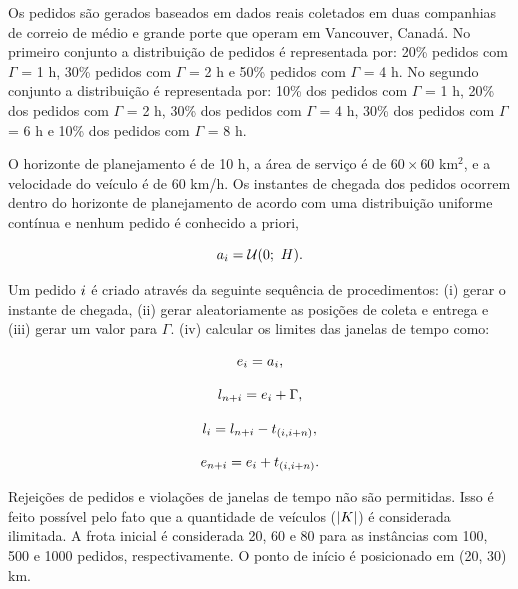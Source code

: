 Os pedidos são gerados baseados em dados reais coletados em duas companhias de 
correio de médio e grande porte que operam em Vancouver, Canadá.
No primeiro conjunto a distribuição de pedidos é representada por: 
20\% pedidos com $\Gamma$ = 1 h, 30\% pedidos com $\Gamma$ = 2 h e 
50\% pedidos com $\Gamma$ = 4 h.
No segundo conjunto a distribuição é representada por: 10\% dos pedidos com 
$\Gamma$ = 1 h, 20\% dos pedidos com $\Gamma$ = 2 h, 30\% dos pedidos com 
$\Gamma$ = 4 h, 30\% dos pedidos com $\Gamma$ = 6 h 
e 10\% dos pedidos com $\Gamma$ = 8 h.

O horizonte de planejamento é de 10 h, a área de serviço é de $60 \times 60$ 
km$^2$, e a velocidade do veículo é de 60 km/h. 
Os instantes de chegada dos pedidos ocorrem dentro do horizonte de planejamento
de acordo com uma distribuição uniforme contínua e nenhum pedido é conhecido 
a priori,

\begin{equation}
  a_i = \mathcal{U}(0;\ H).
\end{equation}


Um pedido $i$ é criado através da seguinte sequência de procedimentos: 
(i) gerar o instante de chegada, 
(ii) gerar aleatoriamente as posições de coleta e entrega e 
(iii) gerar um valor para $\Gamma$.
(iv) calcular os limites das janelas de tempo como:

\begin{equation}
  e_i = a_i,
\end{equation}

\begin{equation}
  l_{n + i} = e_i +
  \Gamma,
\end{equation}

\begin{equation}
  l_i = l_{n + i}
  - t_{(i,i+n)},
\end{equation}

\begin{equation}
  e_{n + i} = e_i
  + t_{(i,i+n)}.
\end{equation}


Rejeições de pedidos e violações de janelas de tempo não são permitidas. 
Isso é feito possível pelo fato que a quantidade de veículos 
($|K|$) é considerada ilimitada. 
A frota inicial é considerada 20, 60 e 80 para as instâncias com 100, 500 e 
1000 pedidos, respectivamente. 
O ponto de início é posicionado em (20, 30) km.



